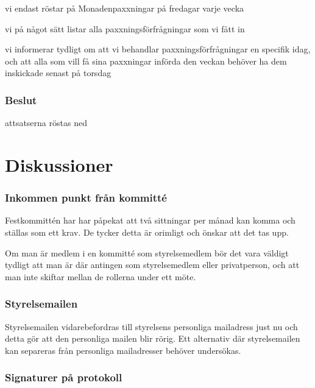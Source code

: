 \documentclass[protokoll]{dvd}
\begin{document}
\begin{attsatser}
    \item vi endast röstar på Monadenpaxxningar på fredagar varje vecka
    \item vi på något sätt listar alla paxxningsförfrågningar som vi fått in 
    \item vi informerar tydligt om att vi behandlar paxxningsförfrågningar en specifik idag, och att alla som vill få sina paxxningar införda den veckan behöver ha dem inskickade senast på torsdag
\end{attsatser}


\subsubsection*{Beslut}
\begin{attsatser}
    \item attsatserna röstas ned 
\end{attsatser}






\section{Diskussioner}\label{sec:discussioner}

\subsubsection{Inkommen punkt från kommitté}

Festkommittén har har påpekat att två sittningar per månad kan komma och ställas som ett krav. De tycker detta är orimligt och önskar att det tas upp.

Om man är medlem i en kommitté som styrelsemedlem bör det vara väldigt tydligt att man är där antingen som styrelsemedlem eller privatperson, och att man inte skiftar mellan de rollerna under ett möte.


\subsubsection{Styrelsemailen}

Styrelsemailen vidarebefordras till styrelsens personliga mailadress just nu och detta gör att den personliga mailen blir rörig. Ett alternativ där styrelsemailen kan separeras från personliga mailadresser behöver undersökas.


\subsubsection{Signaturer på protokoll}
\end{document}
